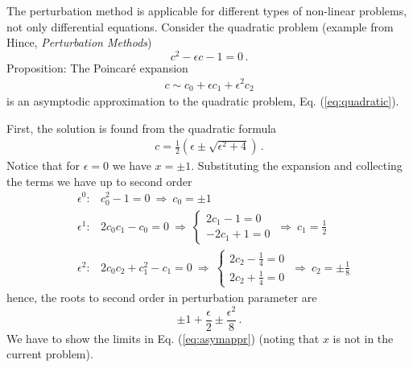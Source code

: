 \begin{example}
    The perturbation method is applicable for different types of non-linear
	problems, not only differential equations. Consider the quadratic problem 
	(example from Hince, \textit{Perturbation Methods})
	\begin{equation}
 	 \label{eq:quadratic}
	  c^2 - \epsilon c -1 = 0 \, .
	\end{equation}
	Proposition: The Poincar\'{e} expansion
	\begin{eqnarray}
		c \sim c_0 + \epsilon c_1 + \epsilon^2c_2 
	\end{eqnarray}
	is an asymptodic approximation to the quadratic problem, Eq. (\ref{eq:quadratic}).

	First, the solution is found from the quadratic formula
	\begin{eqnarray}
		\label{eq:solquadratic}
		c = \frac{1}{2} \left(\epsilon \pm \sqrt{\epsilon^2+4}\right) \, .
	\end{eqnarray}
	Notice that for $\epsilon = 0$	we have $x=\pm 1$. 
	Substituting the expansion and collecting the terms we have up to
	second order 
	\begin{eqnarray}
  	&\epsilon^0:& c_0^2 - 1 = 0 \ \Rightarrow \ c_0 = \pm 1 \\
  	&\epsilon^1:& 2 c_0c_1 - c_0= 0 \ \Rightarrow \ 
                \left\{
                \begin{matrix}
                  2c_1-1  = 0 \\
                  -2c_1 + 1 = 0
                \end{matrix}
  \right. \ \Rightarrow \ c_1 = \frac{1}{2} \\
  &\epsilon^2:& 2c_0c_2 + c_1^2-c_1 = 0
                \ \Rightarrow \ 
                \left\{
                \begin{matrix}
                  2c_2- \frac{1}{4}  = 0 \\
                  2c_2 + \frac{1}{4}= 0
                \end{matrix}
  \right. \ \Rightarrow \ c_2 = \pm \frac{1}{8} 
\end{eqnarray}
hence, the roots to second order in perturbation parameter are
	\begin{equation}
	  \pm 1 + \frac{\epsilon}{2} \pm \frac{\epsilon^2}{8} \, . 
	\end{equation}
	We have to show the limits in Eq. (\ref{eq:asymappr}) (noting that $x$ is 
	not in the current problem). 


\end{example}
